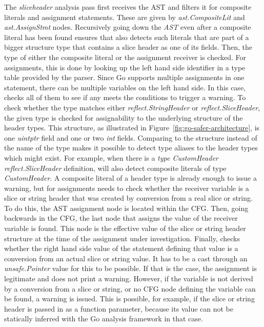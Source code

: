 The \textit{sliceheader} analysis pass first receives the \acrshort{AST} and filters it for composite literals and
assignment statements.
These are given by \textit{ast.CompositeLit} and \textit{ast.AssignStmt} nodes.
Recursively going down the \textit{AST} even after a composite literal has been found ensures that \toolSafer{} also
detects such literals that are part of a bigger structure type that contains a slice header as one of its fields.
Then, the type of either the composite literal or the assignment receiver is checked.
For assignments, this is done by looking up the left hand side identifier in a type table provided by the parser.
Since Go supports multiple assignments in one statement, there can be multiple variables on the left hand side.
In this case, \toolSafer{} checks all of them to see if any meets the conditions to trigger a warning.
To check whether the type matches either \textit{reflect.StringHeader} or \textit{reflect.SliceHeader}, the given type
is checked for assignability to the underlying structure of the header types.
This structure, as illustrated in Figure~\ref{fig:go-safer-architecture}, is one \textit{uintptr} field and one or two
\textit{int} fields.
Comparing to the structure instead of the name of the type makes it possible to detect type aliases to the header types
which might exist.
For example, when there is a \textit{type CustomHeader reflect.SliceHeader} definition, \toolSafer{} will also detect
composite literals of type \textit{CustomHeader}.
A composite literal of a header type is already enough to issue a warning, but for assignments \toolSafer{} needs to
check whether the receiver variable is a slice or string header that was created by conversion from a real slice or
string.
To do this, the \acrshort{AST} assignment node is located within the \acrshort{CFG}.
Then, going backwards in the \acrshort{CFG}, the last node that assigns the value of the receiver variable is found.
This node is the effective value of the slice or string header structure at the time of the assignment under
investigation.
Finally, \toolSafer{} checks whether the right hand side value of the statement defining that value is a conversion
from an actual slice or string value.
It has to be a cast through an \textit{unsafe.Pointer} value for this to be possible.
If that is the case, the assignment is legitimate and \toolSafer{} does not print a warning.
However, if the variable is not derived by a conversion from a slice or string, or no \acrshort{CFG} node defining the
variable can be found, a warning is issued.
This is possible, for example, if the slice or string header is passed in as a function parameter, because
its value can not be statically inferred with the Go analysis framework in that case.


